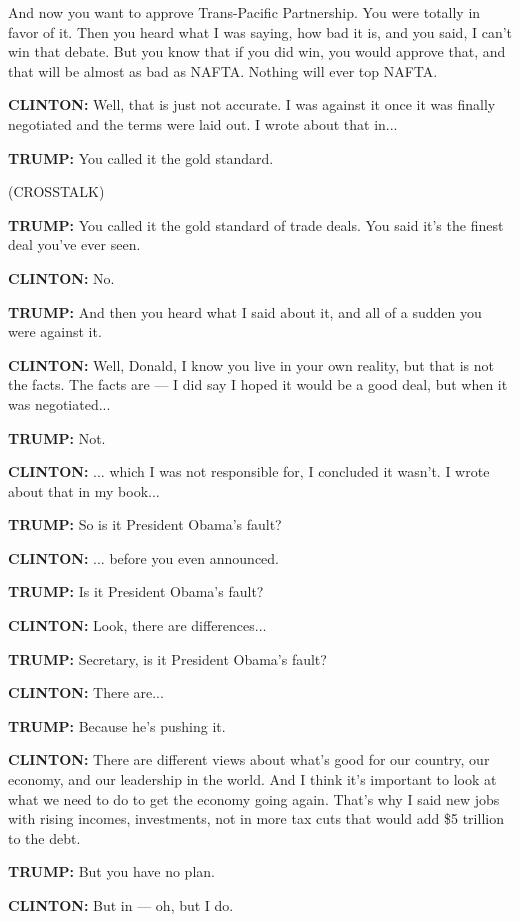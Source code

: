 And now you want to approve Trans-Pacific Partnership. You were totally
in favor of it. Then you heard what I was saying, how bad it is, and you
said, I can't win that debate. But you know that if you did win, you
would approve that, and that will be almost as bad as NAFTA. Nothing
will ever top NAFTA.

\textbf{CLINTON:} Well, that is just not accurate. I was against it once
it was finally negotiated and the terms were laid out. I wrote about
that in...

\textbf{TRUMP:} You called it the gold standard.

(CROSSTALK)

\textbf{TRUMP:} You called it the gold standard of trade deals. You said
it's the finest deal you've ever seen.

\textbf{CLINTON:} No.

\textbf{TRUMP:} And then you heard what I said about it, and all of a
sudden you were against it.

\textbf{CLINTON:} Well, Donald, I know you live in your own reality, but
that is not the facts. The facts are --- I did say I hoped it would be a
good deal, but when it was negotiated...

\textbf{TRUMP:} Not.

\textbf{CLINTON:} ... which I was not responsible for, I concluded it
wasn't. I wrote about that in my book...

\textbf{TRUMP:} So is it President Obama's fault?

\textbf{CLINTON:} ... before you even announced.

\textbf{TRUMP:} Is it President Obama's fault?

\textbf{CLINTON:} Look, there are differences...

\textbf{TRUMP:} Secretary, is it President Obama's fault?

\textbf{CLINTON:} There are...

\textbf{TRUMP:} Because he's pushing it.

\textbf{CLINTON:} There are different views about what's good for our
country, our economy, and our leadership in the world. And I think it's
important to look at what we need to do to get the economy going again.
That's why I said new jobs with rising incomes, investments, not in more
tax cuts that would add \$5 trillion to the debt.

\textbf{TRUMP:} But you have no plan.

\textbf{CLINTON:} But in --- oh, but I do.

